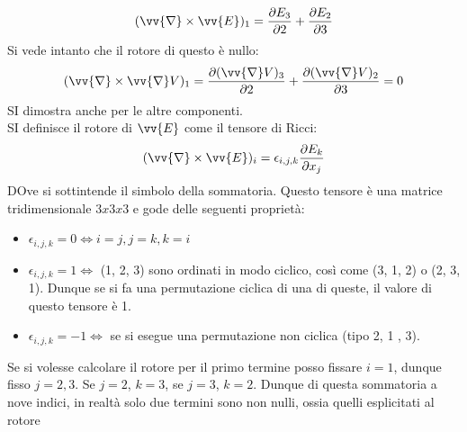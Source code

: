 \documentclass[a4paper, oneside]{article}
\begin{document}
\begin{gather*}
    (\vv{\nabla} \times \vv{E}  )_1 = \frac{\partial E_3}{\partial 2}  + \frac{\partial E_2}{\partial 3} \\
\end{gather*}
Si vede intanto che il rotore di questo è nullo:
\begin{gather*}
    (\vv{\nabla} \times \vv{\nabla} V  )_1 = \frac{\partial (\vv{\nabla}V )_3}{\partial 2} + \frac{\partial (\vv{\nabla}V )_2}{\partial 3} = 0
\end{gather*}
SI dimostra anche per le altre componenti. \\ \noindent
SI definisce il rotore di $\vv{E}$ come il tensore di Ricci:
\begin{gather*}
    (\vv{\nabla} \times \vv{E}  )_i = \epsilon_{i, j, k} \frac{\partial E_k}{\partial x_j} 
\end{gather*} 
DOve si sottintende il simbolo della sommatoria. Questo tensore è una matrice tridimensionale $3x3x3$
e gode delle seguenti proprietà:
\begin{itemize}
    \item $\epsilon_{i, j, k} = 0 \Longleftrightarrow i = j, j = k, k = i$
    \item $\epsilon_{i, j, k } = 1 \Longleftrightarrow $ (1, 2, 3) sono ordinati in modo ciclico, 
    così come (3, 1, 2) o (2, 3, 1). Dunque se si fa una permutazione ciclica di una di queste, 
    il valore di questo tensore è 1.
    \item $\epsilon_{i, j, k} = -1 \Longleftrightarrow$ se si esegue una permutazione 
    non ciclica (tipo 2, 1 , 3).
\end{itemize}
Se si volesse calcolare il rotore per il primo termine posso fissare $i = 1$, dunque fisso $j = 2, 3$. Se
$j = 2$, $k = 3$, se $j = 3$, $k = 2$. Dunque di questa sommatoria a nove indici, in realtà solo due termini sono
non nulli, ossia quelli esplicitati al rotore
\end{document}
